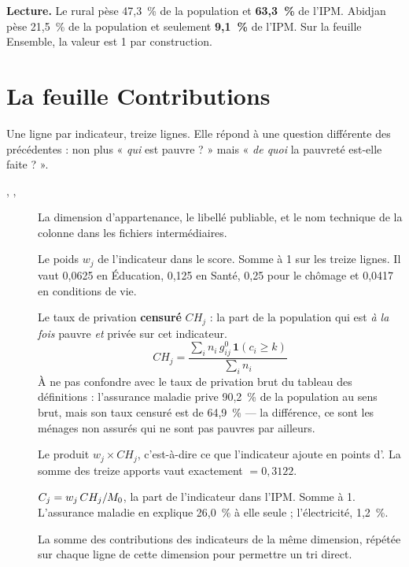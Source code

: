 \documentclass[11pt,a4paper]{article}
\begin{document}
\textbf{Lecture.} Le rural pèse 47,3~\% de la population et \textbf{63,3~\%} de l'IPM. Abidjan
pèse 21,5~\% de la population et seulement \textbf{9,1~\%} de l'IPM. Sur la feuille
\textsf{Ensemble}, la valeur est 1 par construction.

\section{La feuille \textsf{Contributions}}

Une ligne par indicateur, treize lignes. Elle répond à une question différente des précédentes :
non plus « \emph{qui} est pauvre ? » mais « \emph{de quoi} la pauvreté est-elle faite ? ».

\begin{description}
  \item[, , ] La dimension d'appartenance, le libellé
  publiable, et le nom technique de la colonne dans les fichiers intermédiaires.

  \item[] Le poids $w_j$ de l'indicateur dans le score. Somme à 1 sur les treize
  lignes. Il vaut 0,0625 en Éducation, 0,125 en Santé, 0,25 pour le chômage et 0,0417 en
  conditions de vie.

  \item[] Le taux de privation \textbf{censuré} $CH_j$ : la part de
  la population qui est \emph{à la fois} pauvre \emph{et} privée sur cet indicateur.
  \[
  CH_j = \frac{\sum_i n_i \, g^0_{ij} \, \mathbf{1}(c_i \ge k)}{\sum_i n_i}
  \]
  À ne pas confondre avec le taux de privation brut du tableau des définitions : l'assurance
  maladie prive 90,2~\% de la population au sens brut, mais son taux censuré est de 64,9~\% ---
  la différence, ce sont les ménages non assurés qui ne sont pas pauvres par ailleurs.

  \item[] Le produit $w_j \times CH_j$, c'est-à-dire ce que l'indicateur ajoute
  en points d'\ipm{}. La somme des treize apports vaut exactement \ipm{} $= 0{,}3122$.

  \item[] $C_j = w_j \, CH_j / M_{0}$, la part de l'indicateur dans l'IPM.
  Somme à 1. L'assurance maladie en explique 26,0~\% à elle seule ; l'électricité, 1,2~\%.

  \item[] La somme des contributions des indicateurs de la même
  dimension, répétée sur chaque ligne de cette dimension pour permettre un tri direct.
\end{description}
\end{document}
